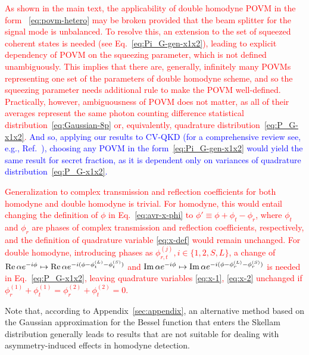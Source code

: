 \documentclass[%
reprint,
superscriptaddress,
 amsmath,amssymb,amsfonts,
 aps,
 pra,
 longbibliography
]{revtex4-2}
\renewcommand{\Re}{\mathop{\rm Re}\nolimits}
\renewcommand{\Im}{\mathop{\rm Im}\nolimits}
\begin{document}

\textcolor{red}{As shown in the main text, the applicability of double homodyne POVM in the form ~\eqref{eq:povm-hetero} may be broken provided that the beam splitter for the signal mode is unbalanced. To resolve this, an extension to the set of squeezed coherent states is needed (see Eq.~\eqref{eq:Pi_G-gen-x1x2}), leading to explicit dependency of POVM on the squeezing parameter, which is not defined unambiguously. This implies that there are, generally, infinitely many POVMs representing one set of the parameters of double homodyne scheme, and so the squeezing parameter needs additional rule to make the POVM well-defined. Practically, however, ambiguousness of POVM does not matter, as  all of their averages represent the same photon counting difference statistical distribution~\eqref{eq:Gaussian-8p} or, equivalently, quadrature distribution~\eqref{eq:P_G-x1x2}.} \textcolor{blue}{And so, applying our results to CV-QKD (for a comprehensive review see, e.g., Ref.~\cite{laudenbach2018continuous}), choosing any POVM in the form~\eqref{eq:Pi_G-gen-x1x2} would yield the same result for secret fraction, as it is dependent only on variances of quadrature distribution~\eqref{eq:P_G-x1x2}.}

\textcolor{red}{Generalization to complex transmission and reflection
  coefficients for both homodyne and double homodyne is trivial. For
  homodyne, this would entail changing the definition of $\phi$ in
  Eq.{~\eqref{eq:avr-x-phi}} to $\phi'\equiv\phi+\phi_t-\phi_r$, where
  $\phi_t$ and $\phi_r$ are phases of complex transmission and
  reflection coefficients, respectively, and the definition of
  quadrature variable {\eqref{eq:x-def}} would remain unchanged. For
  double homodyne, introducing phases as $\phi_{r,t}^{(j)},
  i\in\{1,2,S,L\}$, a change of $\Re\alpha
  e^{-i\phi}\mapsto\Re\alpha
  e^{-i(\phi-\phi_t^{(L)}-\phi_t^{(S)})}$ and $\Im\alpha
  e^{-i\phi}\mapsto\Im\alpha
  e^{-i(\phi-\phi_r^{(L)}-\phi_r^{(S)})}$ is needed in
  Eq.{~\eqref{eq:P_G-x1x2}}, leaving quadrature variables
  {\eqref{eq:x-1}}, {\eqref{eq:x-2}} unchanged if
  $\phi_r^{(1)}+\phi_t^{(1)}=\phi_r^{(2)}+\phi_t^{(2)}=0$.} 

Note that, according to Appendix~\ref{sec:appendix},
an alternative method based on the Gaussian approximation
for the Bessel function that enters the Skellam distribution
generally leads to  results that are not suitable for dealing with
asymmetry-induced effects in homodyne detection.
\end{document}
